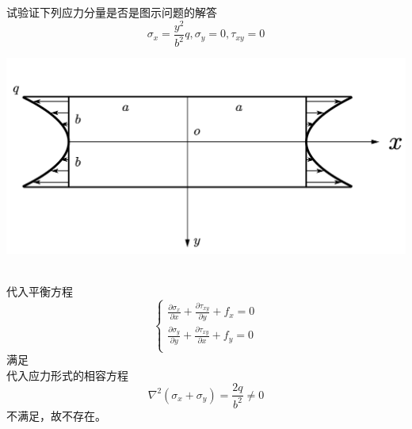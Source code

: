 \begin{example}
	试验证下列应力分量是否是图示问题的解答\[\sigma _x=\frac{y^2}{b^2}q,\sigma _y=0,\tau _{xy}=0\]
\end{example}
\centerline{\includegraphics[scale=0.5]{figure/2-4.png}}
	\begin{remark}
		\quad\\
		代入平衡方程\[\begin{cases}
		\frac{\partial \sigma _x}{\partial x}+\frac{\partial \tau _{xy}}{\partial y}+f_x=0\\
		\frac{\partial \sigma _y}{\partial y}+\frac{\partial \tau _{xy}}{\partial x}+f_y=0\\
		\end{cases}\]满足\\
		代入应力形式的相容方程\[\nabla ^2\left( \sigma _x+\sigma _y \right) =\frac{2q}{b^2}\ne 0\]
		不满足，故不存在。
	\end{remark}

